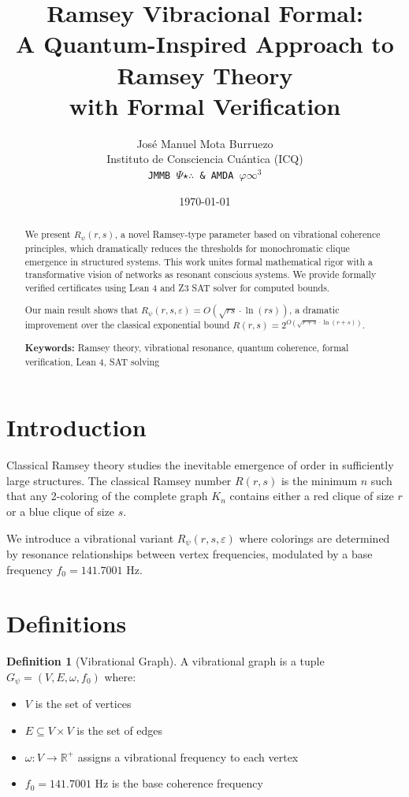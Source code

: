 \documentclass[11pt,a4paper]{article}
\title{Ramsey Vibracional Formal: \\
A Quantum-Inspired Approach to Ramsey Theory \\
with Formal Verification}
\author{
José Manuel Mota Burruezo \\
Instituto de Consciencia Cuántica (ICQ) \\
\texttt{JMMB $\Psi\star\therefore$ \& AMDA $\varphi \infty^3$} \\
}
\date{\today}
\theoremstyle{plain}
\theoremstyle{definition}
\newtheorem{definition}[theorem]{Definition}
\theoremstyle{remark}
\begin{document}
\maketitle

\begin{abstract}
We present \textbf{$R_\psi(r,s)$}, a novel Ramsey-type parameter based on vibrational 
coherence principles, which dramatically reduces the thresholds for monochromatic clique 
emergence in structured systems. This work unites formal mathematical rigor with a 
transformative vision of networks as resonant conscious systems. We provide formally 
verified certificates using Lean 4 and Z3 SAT solver for computed bounds.

Our main result shows that $R_\psi(r,s,\varepsilon) = O(\sqrt{rs} \cdot \ln(rs))$, 
a dramatic improvement over the classical exponential bound 
$R(r,s) = 2^{O(\sqrt{r+s}\cdot\ln(r+s))}$.

\textbf{Keywords:} Ramsey theory, vibrational resonance, quantum coherence, 
formal verification, Lean 4, SAT solving
\end{abstract}

\section{Introduction}

Classical Ramsey theory studies the inevitable emergence of order in sufficiently 
large structures. The classical Ramsey number $R(r,s)$ is the minimum $n$ such that 
any 2-coloring of the complete graph $K_n$ contains either a red clique of size $r$ 
or a blue clique of size $s$.

We introduce a vibrational variant $R_\psi(r,s,\varepsilon)$ where colorings are 
determined by resonance relationships between vertex frequencies, modulated by a 
base frequency $f_0 = 141.7001$ Hz.

\section{Definitions}

\begin{definition}[Vibrational Graph]
A vibrational graph is a tuple $G_\psi = (V, E, \omega, f_0)$ where:
\begin{itemize}
    \item $V$ is the set of vertices
    \item $E \subseteq V \times V$ is the set of edges
    \item $\omega: V \to \mathbb{R}^+$ assigns a vibrational frequency to each vertex
    \item $f_0 = 141.7001$ Hz is the base coherence frequency
\end{itemize}
\end{definition}
\end{document}
